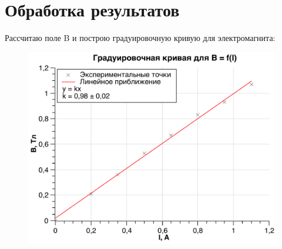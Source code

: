 \documentclass[a4paper, 12pt]{article}
\begin{document}
 \section*{Обработка результатов}
 Рассчитаю поле B и построю градуировочную кривую для электромагнита: \\
 \begin{figure}[!h]
 	\centering
 	\includegraphics[width=\textwidth]{Graphic_1.pdf} 
 	
 \end{figure}
\end{document}
